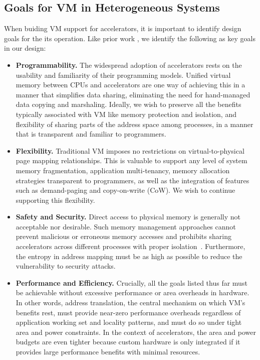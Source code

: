 \subsection{Goals for VM in Heterogeneous Systems}
When buiding VM support for accelerators, it is important to identify
design goals for the its operation. Like prior work
\cite{haria:devirtualizing}, we identify the following as key goals in
our design:

\begin{itemize}
        \item \textbf{Programmability.} The widespread adoption of
          accelerators rests on the usability and familiarity of their
          programming models. Unified virtual memory between CPUs and
          accelerators are one way of achieving this in a manner that
          simplifies data sharing, eliminating the need for
          hand-managed data copying and marshaling. Ideally, we wish
          to preserve all the benefits typically associated with VM
          like memory protection and isolation, and flexibility of
          sharing parts of the address space among processes, in a
          manner that is transparent and familiar to programmers.

        \item \textbf{Flexibility.} Traditional VM imposes no
          restrictions on virtual-to-physical page mapping
          relationships. This is valuable to support any level of
          system memory fragmentation, application multi-tenancy,
          memory allocation strategies transparent to programmers, as
          well as the integration of features such as demand-paging
          and copy-on-write (CoW). We wish to continue supporting this
          flexibility.

        \item \textbf{Safety and Security.} Direct access to physical
          memory is generally not acceptable nor desirable. Such
          memory management approaches cannot prevent malicious or
          erroneous memory accesses and prohibits sharing accelerators
          across different processes with proper
          isolation~\cite{haria:devirtualizing}. Furthermore, the
          entropy in address mapping must be as high as possible to
          reduce the vulnerability to security attacks.

        \item \textbf{Performance and Efficiency.} Crucially, all the
          goals listed thus far must be achievable without excessive
          performance or area overheads in hardware. In other words,
          address translation, the central mechanism on which VM's
          benefits rest, must provide near-zero performance overheads
          regardless of application working set and locality patterns,
          and must do so under tight area and power constraints. In
          the context of accelerators, the area and power budgets are
          even tighter because custom hardware is only integrated if
          it provides large performance benefits with minimal
          resources.


\end{itemize}


